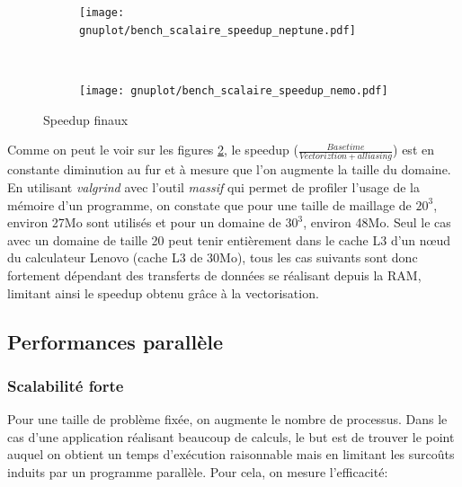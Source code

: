 \begin{figure}[!ht]
  \centering
  \begin{subfigure}[b]{0.5\textwidth}
    \centering
    \texttt{[image: gnuplot/bench\_scalaire\_speedup\_neptune.pdf]}
  \caption{\label{fig:bench_scal_neptune_speedup}}
  \end{subfigure}%
  ~
  \begin{subfigure}[b]{0.5\textwidth}
    \centering
    \texttt{[image: gnuplot/bench\_scalaire\_speedup\_nemo.pdf]}
  \caption{\label{fig:bench_scal_nemo_speedup}}
  \end{subfigure}
  \caption{\label{fig:bench_scal_speedups}Speedup finaux}
\end{figure}

Comme on peut le voir sur les figures \ref{fig:bench_scal_nemo_speedup}, le speedup ($\frac{Base time}{Vectoriztion+alliasing}$) est en constante diminution au fur et à mesure que l'on augmente la taille du domaine. En utilisant \textit{valgrind} avec l'outil \textit{massif} qui permet de profiler l'usage de la mémoire d'un programme, on constate que pour une taille de maillage de $20^3$, environ 27Mo sont utilisés et pour un domaine de $30^3$, environ 48Mo. Seul le cas avec un domaine de taille 20 peut tenir entièrement dans le cache L3 d'un nœud du calculateur Lenovo (cache L3 de 30Mo), tous les cas suivants sont donc fortement dépendant des transferts de données se réalisant depuis la RAM, limitant ainsi le speedup obtenu grâce à la vectorisation.

\subsection{Performances parallèle}\label{sec:scal}


\subsubsection{Scalabilité forte}\label{sec:scal-strong}
Pour une taille de problème fixée, on augmente le nombre de processus. Dans le cas d'une application réalisant beaucoup de calculs, le but est de trouver le point auquel on obtient un temps d'exécution raisonnable mais en limitant les surcoûts induits par un programme parallèle. Pour cela, on mesure l'efficacité:

